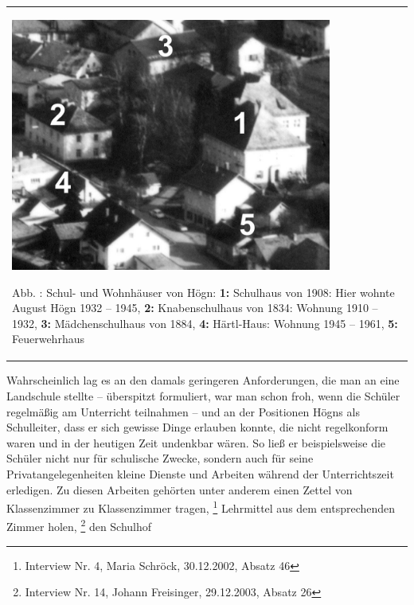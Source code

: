 \documentclass[a4paper]{article}
\newcounter{Abb}
\renewcommand\theAbb{\arabic{Abb}}
\begin{document}
\begin{center}
\begin{minipage}{10.931cm}
\begin{flushleft}
\tablefirsthead{}
\tablehead{}
\tabletail{}
\tablelasttail{}
\begin{supertabular}{m{10.731cm}}

\includegraphics[width=10.548cm,height=8.313cm]{pictures/zulassungsarbeit-img030.jpg}

Abb. \stepcounter{Abb}{\theAbb}: Schul- und Wohnhäuser von Högn:
\textbf{1:} Schulhaus von 1908: Hier wohnte August Högn 1932 – 1945,
\textbf{2:} Knabenschulhaus von 1834: Wohnung 1910 – 1932, \textbf{3:}
Mädchenschulhaus von 1884, \textbf{4:} Härtl-Haus: Wohnung 1945 – 1961,
\textbf{5:} Feuerwehrhaus\\
\end{supertabular}
\end{flushleft}
\end{minipage}
\end{center}
Wahrscheinlich lag es an den damals geringeren Anforderungen, die man an
eine Landschule stellte – überspitzt formuliert, war man schon froh,
wenn die Schüler regelmäßig am Unterricht teilnahmen – und an der
Positionen Högns als Schulleiter, dass er sich gewisse Dinge erlauben
konnte, die nicht regelkonform waren und in der heutigen Zeit undenkbar
wären. So ließ er beispielsweise die Schüler nicht nur für schulische
Zwecke, sondern auch für seine Privatangelegenheiten kleine Dienste und
Arbeiten während der Unterrichtszeit erledigen. Zu diesen Arbeiten
gehörten unter anderem einen Zettel von Klassenzimmer zu Klassenzimmer
tragen, \footnote{Interview Nr. 4, Maria Schröck, 30.12.2002, Absatz
46} Lehrmittel aus dem entsprechenden Zimmer holen, \footnote{Interview
Nr. 14, Johann Freisinger, 29.12.2003, Absatz 26} den Schulhof
\end{document}
